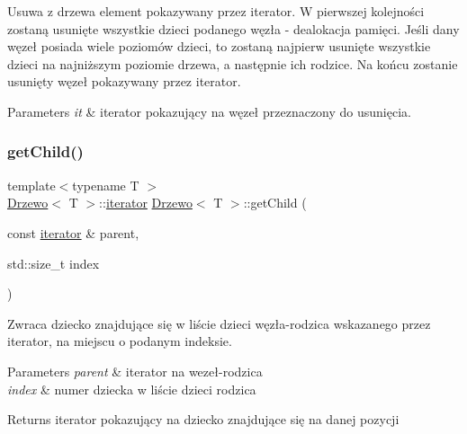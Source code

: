 Usuwa z drzewa element pokazywany przez iterator. W pierwszej kolejności zostaną usunięte wszystkie dzieci podanego węzła -\/ dealokacja pamięci. Jeśli dany węzeł posiada wiele poziomów dzieci, to zostaną najpierw usunięte wszystkie dzieci na najniższym poziomie drzewa, a następnie ich rodzice. Na końcu zostanie usunięty węzeł pokazywany przez iterator.


\begin{DoxyParams}{Parameters}
{\em it} & iterator pokazujący na węzeł przeznaczony do usunięcia. \\
\hline
\end{DoxyParams}
\mbox{\label{class_drzewo_ae45271ae9e1b1071d56c87df7eb37cad}} 
\subsubsection{\texorpdfstring{get\+Child()}{getChild()}}
{\footnotesize\ttfamily template$<$typename T $>$ \\
\hyperlink{class_drzewo}{Drzewo}$<$ T $>$\+::\hyperlink{class_drzewo_1_1iterator}{iterator} \hyperlink{class_drzewo}{Drzewo}$<$ T $>$\+::get\+Child (\begin{DoxyParamCaption}\item[{const \hyperlink{class_drzewo_1_1iterator}{iterator} \&}]{parent,  }\item[{std\+::size\+\_\+t}]{index }\end{DoxyParamCaption})\hspace{0.3cm}{\ttfamily [inline]}}

Zwraca dziecko znajdujące się w liście dzieci węzła-\/rodzica wskazanego przez iterator, na miejscu o podanym indeksie.


\begin{DoxyParams}{Parameters}
{\em parent} & iterator na wezeł-\/rodzica \\
\hline
{\em index} & numer dziecka w liście dzieci rodzica \\
\hline
\end{DoxyParams}
\begin{DoxyReturn}{Returns}
iterator pokazujący na dziecko znajdujące się na danej pozycji 
\end{DoxyReturn}
\mbox{\label{class_drzewo_a0f5f70f7dfe35ffce3bb5ba3ac23657b}} 
